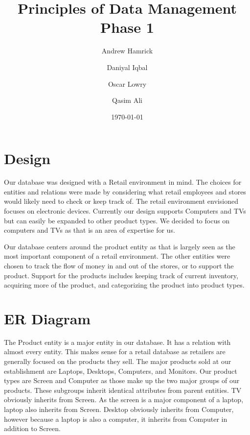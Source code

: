 \documentclass[12pt]{article}
\title{Principles of Data Management\\\Large Phase 1}
\date{\today}
\author{
	Andrew Hamrick
	\and
	Daniyal Iqbal
	\and
	Oscar Lowry
	\and
	Qasim Ali
}
\begin{document}
	\maketitle
	\newpage

	\section{Design}
		Our database was designed with a Retail environment in mind. The choices for
		entities and relations were made by considering what retail employees and
		stores would likely need to check or keep track of. The retail environment
		envisioned focuses on electronic devices. Currently our design supports
		Computers and TVs but can easily be expanded to other product types. We
		decided to focus on computers and TVs as that is an area of expertise for
		us.\\
		\vspace{0pt}

		Our database centers around the product entity as that is largely seen as
		the most important component of a retail environment. The other entities
		were chosen to track the flow of money in and out of the stores, or to
		support the product. Support for the products includes keeping track of
		current inventory, acquiring more of the product, and categorizing the
		product into product types.

	\section{ER Diagram}
    The Product entity is a major entity in our database. It has a relation with
    almost every entity. This makes sense for a retail database as retailers are
    generally focused on the products they sell. The major products sold at our
    establishment are Laptops, Desktops, Computers, and Monitors. Our product
    types are Screen and Computer as those make up the two major groups of our
    products.  These subgroups inherit identical attributes from parent
    entities.  TV obviously inherits from Screen. As the screen is a major
    component of a laptop, laptop also inherits from Screen.  Desktop obviously
    inherits from Computer, however because a laptop is also a computer, it
    inherits from Computer in addition to Screen.
\end{document}
